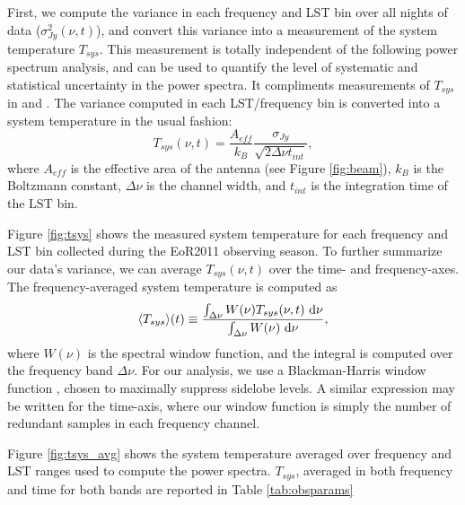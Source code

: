 First, we compute the variance in each frequency and LST bin over all nights of data
($\sigma_{Jy}^2(\nu,t)$), and convert this variance into a measurement of the system temperature
$T_{sys}$. This measurement is totally independent of
the following power spectrum analysis, and can be used to quantify the level of systematic and
statistical uncertainty in the power spectra. It compliments measurements of $T_{sys}$ in
\citet{Parsons2014} and \citet{Jacobs2014}. The variance computed in each LST/frequency bin is
converted into a system temperature in the usual fashion:
\begin{equation}
  T_{sys}(\nu,t) = \frac{A_{eff}}{k_B}\frac{\sigma_{Jy}}{\sqrt{2\Delta\nu t_{int}}},
  \label{eq:tsys}
\end{equation}
where $A_{eff}$ is the effective area of the antenna (see Figure \ref{fig:beam}), $k_B$ is the
Boltzmann constant, $\Delta\nu$ is the channel width, and $t_{int}$ is the integration time of the
LST bin.

Figure \ref{fig:tsys} shows the measured system temperature for each frequency and LST bin collected
during the EoR2011 observing season. To further summarize our data's variance, we can average
$T_{sys}(\nu,t)$ over the time- and frequency-axes. The frequency-averaged system temperature is
computed as 
\begin{equation}
  \langle T_{sys}\rangle(t) \equiv \frac{\int_{\Delta\nu}
  W(\nu)T_{sys}(\nu,t)\ \mathrm{d}\nu}{\int_{\Delta\nu}W(\nu)\ \mathrm{d}\nu},
  \label{eq:tsys_avg}
\end{equation}
where $W(\nu)$ is the spectral window function, and the integral is computed over the frequency band
$\Delta\nu$. For our analysis, we use a Blackman-Harris window function \cite{Harris1978}, chosen to
maximally suppress sidelobe levels. A similar expression may be written for the time-axis, where our
window function is simply the number of redundant samples in each frequency channel.

Figure \ref{fig:tsys_avg} shows the system temperature averaged over frequency and LST ranges used
to compute the power spectra. $T_{sys}$, averaged in both frequency and time for both bands are
reported in Table \ref{tab:obsparams}
